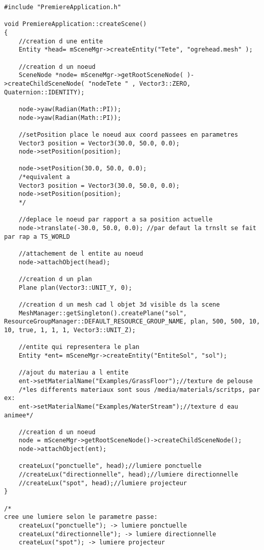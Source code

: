 \begin{lstlisting}[caption={PremiereApplication.cpp: ajout d'une méthode pour la gestion de lumière et des ombres}]
#include "PremiereApplication.h"

void PremiereApplication::createScene()
{
    //creation d une entite
    Entity *head= mSceneMgr->createEntity("Tete", "ogrehead.mesh" );
    
    //creation d un noeud
    SceneNode *node= mSceneMgr->getRootSceneNode( )->createChildSceneNode( "nodeTete " , Vector3::ZERO, Quaternion::IDENTITY);
    
    node->yaw(Radian(Math::PI));
    node->yaw(Radian(Math::PI));

    //setPosition place le noeud aux coord passees en parametres
    Vector3 position = Vector3(30.0, 50.0, 0.0);
    node->setPosition(position);

    node->setPosition(30.0, 50.0, 0.0); 
    /*equivalent a
    Vector3 position = Vector3(30.0, 50.0, 0.0);
    node->setPosition(position);
    */

    //deplace le noeud par rapport a sa position actuelle
    node->translate(-30.0, 50.0, 0.0); //par defaut la trnslt se fait par rap a TS_WORLD
   
    //attachement de l entite au noeud
    node->attachObject(head);

    //creation d un plan
    Plane plan(Vector3::UNIT_Y, 0);

    //creation d un mesh cad l objet 3d visible ds la scene
    MeshManager::getSingleton().createPlane("sol",  ResourceGroupManager::DEFAULT_RESOURCE_GROUP_NAME, plan, 500, 500, 10, 10, true, 1, 1, 1, Vector3::UNIT_Z); 

    //entite qui representera le plan
    Entity *ent= mSceneMgr->createEntity("EntiteSol", "sol");

    //ajout du materiau a l entite
    ent->setMaterialName("Examples/GrassFloor");//texture de pelouse
    /*les differents materiaux sont sous /media/materials/scritps, par ex:
    ent->setMaterialName("Examples/WaterStream");//texture d eau animee*/

    //creation d un noeud
    node = mSceneMgr->getRootSceneNode()->createChildSceneNode();
    node->attachObject(ent);

    createLux("ponctuelle", head);//lumiere ponctuelle
    //createLux("directionnelle", head);//lumiere directionnelle
    //createLux("spot", head);//lumiere projecteur
}

/*
cree une lumiere selon le parametre passe:
    createLux("ponctuelle"); -> lumiere ponctuelle
    createLux("directionnelle"); -> lumiere directionnelle
    createLux("spot"); -> lumiere projecteur
    

\end{lstlisting}
